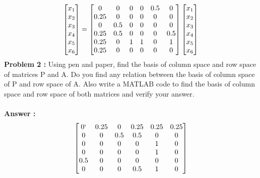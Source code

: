 \documentclass{article}
\begin{document}
$$
\begin{bmatrix}
	x\textsubscript{1}\\
	x\textsubscript{2}\\
	x\textsubscript{3}\\
	x\textsubscript{4}\\
	x\textsubscript{5}\\
	x\textsubscript{6}\\
\end{bmatrix}= 
\begin{bmatrix} 
	0 & 0 & 0 & 0 & 0.5 & 0 \\
	0.25 & 0 & 0 & 0 & 0 & 0\\
	0 & 0.5 & 0 & 0 & 0 & 0 \\
	0.25 & 0.5 & 0 & 0 & 0 & 0.5 \\
	0.25 & 0 & 1 & 1 & 0 & 1 \\
	0.25 & 0 & 0 & 0 & 0 & 0 \\
\end{bmatrix}
\begin{bmatrix}
	x\textsubscript{1}\\
	x\textsubscript{2}\\
	x\textsubscript{3}\\
	x\textsubscript{4}\\
	x\textsubscript{5}\\
	x\textsubscript{6}\\
\end{bmatrix}
$$
\textbf{Problem 2 :} Using pen and paper, find the basis of column space and row space of matrices P and A. Do you find any relation between the basis of column space of P and row space of A. Also write a MATLAB code to find the basis of column space and row space of both matrices and verify your answer.
\\\\\textbf{Answer :}
\\
$$
\begin{bmatrix} 
	0   `& 0.25 & 0   & 0.25 & 0.25 & 0.25 \\
	0   & 0    & 0.5 & 0.5  & 0   & 0     \\
	0   & 0    & 0   & 0    & 1   & 0     \\
	0   & 0    & 0   & 0    & 1   & 0     \\
	0.5 & 0    & 0   & 0    & 0   & 0     \\
	0   & 0    & 0   & 0.5  & 1   & 0     \\
\end{bmatrix}
$$
\end{document}
